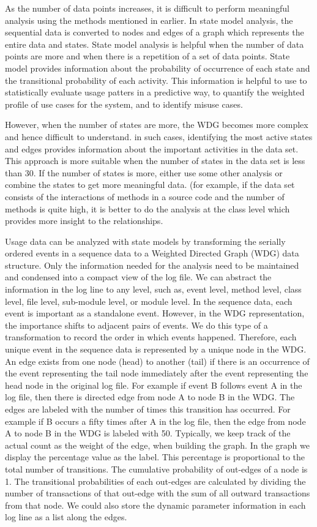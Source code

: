 As the number of data points increases, it is difficult to perform meaningful analysis using the methods mentioned in earlier. In state model analysis, the sequential data is converted to nodes and edges of a graph which represents the entire data and states.  State model analysis is helpful when the number of data points are more and when there is a repetition of a set of data points. State model provides information about the probability of occurrence of each state and the transitional probability of each activity.  This information is helpful to use to statistically evaluate usage patters in a predictive way, to quantify the weighted profile of use cases for the system, and to identify misuse cases.

However, when the number of states are more, the WDG becomes more complex and hence difficult to understand. in such cases, identifying the most active states and edges provides information about the important activities in the data set. This approach is more suitable when the number of states in the data set is less than 30. If the number of states is more, either use some other analysis or combine the states to get more meaningful data. (for example, if the data set consists of the interactions of methods in a source code and the number of methods is quite high, it is better to do the analysis at the class level which provides more insight to the relationships.

Usage data can be analyzed with state models by transforming the serially ordered events in a sequence data to a Weighted Directed Graph (WDG) data structure. Only the information needed for the analysis need to be maintained and condensed into a compact view of the log file. We can abstract the information in the log line to any level, such as, event level, method level, class level, file level, sub-module level, or module level. In the sequence data, each event is important as a standalone event. However, in the WDG representation, the importance shifts to adjacent pairs of events. We do this type of a transformation to record the order in which events happened. Therefore, each unique event in the sequence data is represented by a unique node in the WDG. An edge exists from one node (head) to another (tail) if there is an occurrence of the event representing the tail node immediately after the event representing the head node in the original log file. For example if event B follows event A in the log file, then there is directed edge from node A to node B in the WDG. The edges are labeled with the number of times this transition has occurred.  For example if B occurs a fifty times after A in the log file, then the edge from node A to node B in the WDG is labeled with 50. Typically, we keep track of the actual count as the weight of the edge, when building the graph. In the graph we display the percentage value as the label. This percentage is proportional to the total number of transitions.  The cumulative probability of out-edges of a node is 1. The transitional probabilities of each out-edges are calculated by dividing the number of transactions of that out-edge with the sum of all outward transactions from that node. We could also store the dynamic parameter information in each log line as a list along the edges. 

